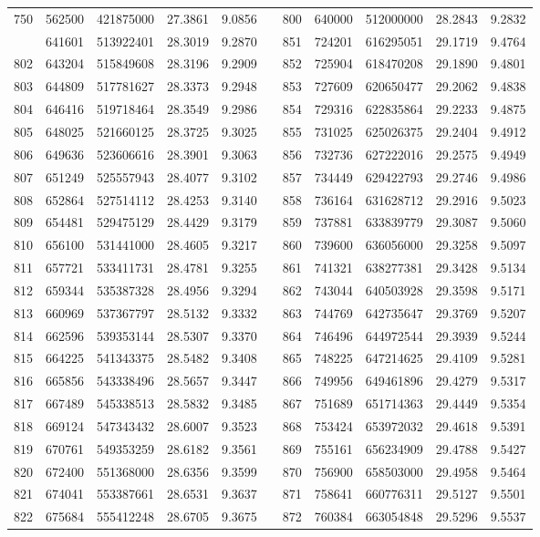 \begin{longtable}{rrrrrrrrrrr}
750&562500&421875000&27.3861&9.0856&&800&640000&512000000&28.2843&9.2832\\
\newpage
801&641601&513922401&28.3019&9.2870&&851&724201&616295051&29.1719&9.4764\\
802&643204&515849608&28.3196&9.2909&&852&725904&618470208&29.1890&9.4801\\
803&644809&517781627&28.3373&9.2948&&853&727609&620650477&29.2062&9.4838\\
804&646416&519718464&28.3549&9.2986&&854&729316&622835864&29.2233&9.4875\\
805&648025&521660125&28.3725&9.3025&&855&731025&625026375&29.2404&9.4912\\
806&649636&523606616&28.3901&9.3063&&856&732736&627222016&29.2575&9.4949\\
807&651249&525557943&28.4077&9.3102&&857&734449&629422793&29.2746&9.4986\\
808&652864&527514112&28.4253&9.3140&&858&736164&631628712&29.2916&9.5023\\
809&654481&529475129&28.4429&9.3179&&859&737881&633839779&29.3087&9.5060\\
810&656100&531441000&28.4605&9.3217&&860&739600&636056000&29.3258&9.5097\\
811&657721&533411731&28.4781&9.3255&&861&741321&638277381&29.3428&9.5134\\
812&659344&535387328&28.4956&9.3294&&862&743044&640503928&29.3598&9.5171\\
813&660969&537367797&28.5132&9.3332&&863&744769&642735647&29.3769&9.5207\\
814&662596&539353144&28.5307&9.3370&&864&746496&644972544&29.3939&9.5244\\
815&664225&541343375&28.5482&9.3408&&865&748225&647214625&29.4109&9.5281\\
816&665856&543338496&28.5657&9.3447&&866&749956&649461896&29.4279&9.5317\\
817&667489&545338513&28.5832&9.3485&&867&751689&651714363&29.4449&9.5354\\
818&669124&547343432&28.6007&9.3523&&868&753424&653972032&29.4618&9.5391\\
819&670761&549353259&28.6182&9.3561&&869&755161&656234909&29.4788&9.5427\\
820&672400&551368000&28.6356&9.3599&&870&756900&658503000&29.4958&9.5464\\
821&674041&553387661&28.6531&9.3637&&871&758641&660776311&29.5127&9.5501\\
822&675684&555412248&28.6705&9.3675&&872&760384&663054848&29.5296&9.5537\\

\end{longtable}
